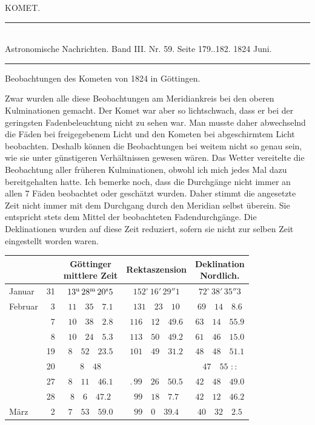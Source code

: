 \clearpage
{}
\hypertarget{native-455-comet}{}
\begin{center}
{\large KOMET.}
\end{center}

\begin{center}
\rule{6cm}{0.4pt}\\
Astronomische Nachrichten. Band III. Nr. 59. Seite 179..182. 1824 Juni.\\
\rule{6cm}{0.4pt}
\end{center}

\begin{center}
Beobachtungen des Kometen von 1824 in Göttingen.
\end{center}

Zwar wurden alle diese Beobachtungen am Meridiankreis bei den oberen Kulminationen gemacht. Der Komet war aber so lichtschwach, dass er bei der geringsten Fadenbeleuchtung nicht zu sehen war. Man musste daher abwechselnd die Fäden bei freigegebenem Licht und den Kometen bei abgeschirmtem Licht beobachten. Deshalb können die Beobachtungen bei weitem nicht so genau sein, wie sie unter günstigeren Verhältnissen gewesen wären. Das Wetter vereitelte die Beobachtung aller früheren Kulminationen, obwohl ich mich jedes Mal dazu bereitgehalten hatte. Ich bemerke noch, dass die Durchgänge nicht immer an allen 7 Fäden beobachtet oder geschätzt wurden. Daher stimmt die angesetzte Zeit nicht immer mit dem Durchgang durch den Meridian selbst überein. Sie entspricht stets dem Mittel der beobachteten Fadendurchgänge. Die Deklinationen wurden auf diese Zeit reduziert, sofern sie nicht zur selben Zeit eingestellt worden waren.

\begin{center}
\begingroup\small\setlength{\tabcolsep}{4pt}
\begin{tabular}{lr|c|c|c}
\multicolumn{2}{c|}{} & \shortstack{Göttinger\\mittlere Zeit} & Rektaszension & \shortstack{Deklination\\Nordlich.} \\
\hline
Januar & 31 & $13^{\rm u}\,28^{\rm m}\,20^{\rm s}5$ & $152^{\circ}\,16'\,29''1$ & $72^{\circ}\,38'\,35''3$ \\
Februar & 3 & $11\quad35\quad7.1$ & $131\quad23\quad10$ & $69\quad14\quad8.6$ \\
 & 7 & $10\quad38\quad2.8$ & $116\quad12\quad49.6$ & $63\quad14\quad55.9$ \\
 & 8 & $10\quad24\quad5.3$ & $113\quad50\quad49.2$ & $61\quad46\quad15.0$ \\
 & 19 & $8\quad52\quad23.5$ & $101\quad49\quad31.2$ & $48\quad48\quad51.1$ \\
 & 20 & $8\quad48$ &  & $47\quad55$ \quad :\,: \\
 & 27 & $8\quad11\quad46.1$ & .\,$99\quad26\quad50.5$ & $42\quad48\quad49.0$ \\
 & 28 & $8\quad6\quad47.2$ & $99\quad18\quad7.7$ & $42\quad12\quad46.2$ \\
März & 2 & $7\quad53\quad59.0$ & $99\quad0\quad39.4$ & $40\quad32\quad2.5$ \\
\end{tabular}
\endgroup
\end{center}


